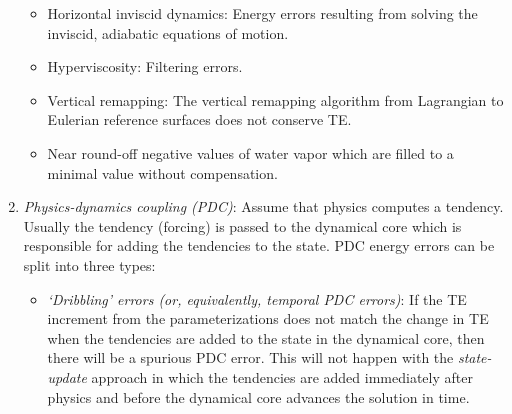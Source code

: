 \documentclass[draft,linenumbers]{agujournal}
\begin{document}
\begin{enumerate}
\begin{itemize}
\item Horizontal inviscid dynamics: Energy errors resulting from solving the inviscid, adiabatic equations of motion.
\item Hyperviscosity: Filtering errors.
\item Vertical remapping: The vertical remapping algorithm from Lagrangian to Eulerian reference surfaces does not conserve TE.
\item Near round-off negative values of water vapor which are filled to a minimal value without compensation.
\end{itemize}
    {}    
\item \label{item:pdc}{\em{Physics-dynamics coupling (PDC)}}: Assume that physics computes a tendency. Usually the tendency (forcing) is passed to the dynamical core which is responsible for adding the tendencies to the state. PDC energy errors can be split into three types:
\begin{itemize}
\item {\em{`Dribbling' errors (or, equivalently, temporal PDC errors)}}: If the TE increment from the parameterizations does not match the change in TE when the tendencies are added to the state in the dynamical core, then there will be a spurious PDC error. This will not happen with the {\em{state-update}} approach in which the tendencies are added immediately after physics and before the dynamical core advances the solution in time.


\end{itemize}
\end{enumerate}
\end{document}
